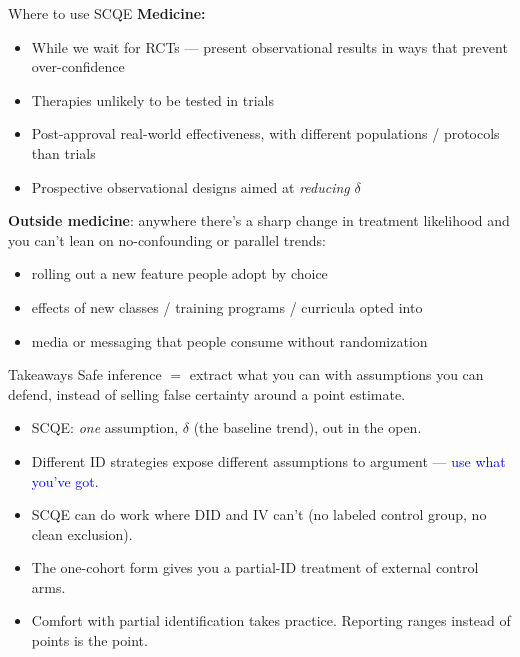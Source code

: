 \documentclass[handout,xcolor=dvipsnames,pdftex,hyperref={colorlinks=false}]{beamer}
\newcommand\makegaps{\addtolength{\itemsep}{.25\baselineskip}}
\begin{document}
\begin{frame}{Where to use SCQE}
\small
{} \textbf{Medicine:}
\begin{itemize}
\item While we wait for RCTs --- present observational results in ways that prevent over-confidence
\item Therapies unlikely to be tested in trials
\item Post-approval real-world effectiveness, with different populations / protocols than trials
\item Prospective observational designs aimed at \emph{reducing} $\delta$
\end{itemize}
\bigskip
{} \textbf{Outside medicine}: anywhere there's a sharp change in treatment likelihood and you can't lean on no-confounding or parallel trends:
\begin{itemize}
 \item rolling out a new feature people adopt by choice
 \item effects of new classes / training programs / curricula opted into
 \item media or messaging that people consume without randomization
 \end{itemize}
\end{frame}

\begin{frame}{Takeaways}
 Safe inference $=$ extract what you can with assumptions you can defend, instead of selling false certainty around a point estimate.\\
\bigskip
\small
\begin{itemize}\makegaps
\item<2-> SCQE: \emph{one} assumption, $\delta$ (the baseline trend), out in the open.
\item<3-> Different ID strategies expose different assumptions to argument --- \textcolor{blue}{use what you've got.}
\item<4-> SCQE can do work where DID and IV can't (no labeled control group, no clean exclusion).
\item<5-> The one-cohort form gives you a partial-ID treatment of external control arms.
\item<6-> Comfort with partial identification takes practice. Reporting ranges instead of points is the point.
\end{itemize}
\end{frame}

\appendix
\end{document}
